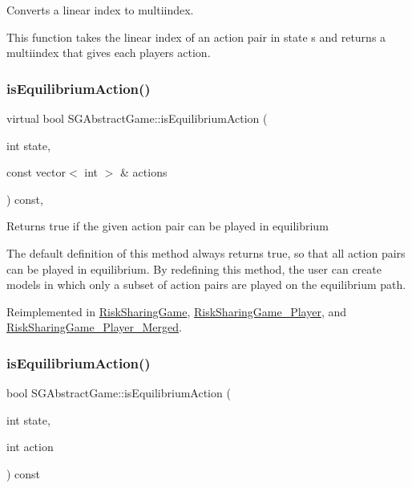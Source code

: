 Converts a linear index to multiindex. 

This function takes the linear index of an action pair in state s and returns a multiindex that gives each player\textquotesingle{}s action. \mbox{\label{classSGAbstractGame_a2cec8147c3055cfe6314da349d1a7344}} 
\subsubsection{\texorpdfstring{is\+Equilibrium\+Action()}{isEquilibriumAction()}\hspace{0.1cm}{\footnotesize\ttfamily [1/2]}}
{\footnotesize\ttfamily virtual bool S\+G\+Abstract\+Game\+::is\+Equilibrium\+Action (\begin{DoxyParamCaption}\item[{int}]{state,  }\item[{const vector$<$ int $>$ \&}]{actions }\end{DoxyParamCaption}) const\hspace{0.3cm}{\ttfamily [inline]}, {\ttfamily [virtual]}}

Returns true if the given action pair can be played in equilibrium

The default definition of this method always returns true, so that all action pairs can be played in equilibrium. By redefining this method, the user can create models in which only a subset of action pairs are played on the equilibrium path. 

Reimplemented in \hyperlink{classRiskSharingGame_a7da6b669317562cd9df8dfc0f8226b4c}{Risk\+Sharing\+Game}, \hyperlink{classRiskSharingGame__3Player_a79f44b04c558ecd72cf0b464fdd8a317}{Risk\+Sharing\+Game\+\_\+Player}, and \hyperlink{classRiskSharingGame__3Player__Merged_aeff4f08e00ef46bbdbb190c9c6c393a4}{Risk\+Sharing\+Game\+\_\+Player\+\_\+\+Merged}.

\mbox{\label{classSGAbstractGame_aa7b88a879bd7b7aa7e275c0e0e92a3d8}} 
\subsubsection{\texorpdfstring{is\+Equilibrium\+Action()}{isEquilibriumAction()}\hspace{0.1cm}{\footnotesize\ttfamily [2/2]}}
{\footnotesize\ttfamily bool S\+G\+Abstract\+Game\+::is\+Equilibrium\+Action (\begin{DoxyParamCaption}\item[{int}]{state,  }\item[{int}]{action }\end{DoxyParamCaption}) const\hspace{0.3cm}{\ttfamily [inline]}}

